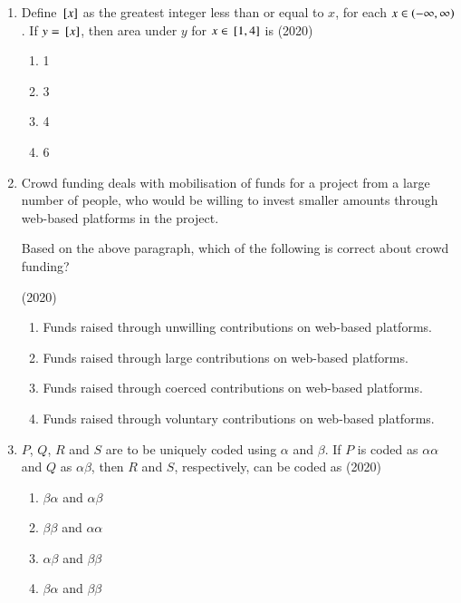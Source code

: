\documentclass[journal]{IEEEtran}
\begin{document}
\begin{enumerate}
What does the phrase "having said that" mean in the given text?  \hfill(2020)
\begin{multicols}{2}
\begin{enumerate}
\item as opposed to what I have said
\item despite what I have said
\item in addition to what I have said
\item contrary to what I have said
\end{enumerate}
\end{multicols}


\item Define ${}\left[x\right]$ as the greatest integer less than or equal to $x$, for each $x\in \left(-\infty,\infty\right)$. If $y={}\left[x\right]$, then area under $y$ for $x\in{}\left[1,4\right]$ is \hfill(2020)
\begin{multicols}{2}
\begin{enumerate}
\item 1
\item 3
\item 4
\item 6
\end{enumerate}
\end{multicols}


\item Crowd funding deals with mobilisation of funds for a project from a large number of people, who would be willing to invest smaller amounts through web-based platforms in the project.

Based on the above paragraph, which of the following is correct about crowd funding?

\hfill(2020)
\begin{enumerate}
\item Funds raised through unwilling contributions on web-based platforms.
\item Funds raised through large contributions on web-based platforms.
\item Funds raised through coerced contributions on web-based platforms.
\item Funds raised through voluntary contributions on web-based platforms.
\end{enumerate}


\item $P$, $Q$, $R$ and $S$ are to be uniquely coded using $\alpha$ and $\beta$. If $P$ is coded as $\alpha\alpha$ and $Q$ as $\alpha\beta$, then $R$ and $S$, respectively, can be coded as \hfill(2020)
\begin{multicols}{2}
\begin{enumerate}
\item $\beta\alpha$ and $\alpha\beta$
\item $\beta\beta$ and $\alpha\alpha$
\item $\alpha\beta$ and $\beta\beta$
\item $\beta\alpha$ and $\beta\beta$
\end{enumerate}
\end{multicols}



\end{enumerate}
\end{document}
